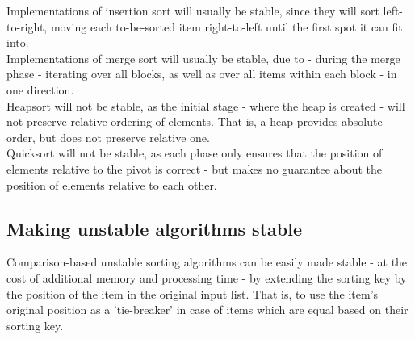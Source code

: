 \documentclass[a4paper]{scrartcl}
\begin{document}
Implementations of insertion sort will usually be stable, since they will sort
left-to-right, moving each to-be-sorted item right-to-left until the first spot
it can fit into.
\\ 
Implementations of merge sort will usually be stable, due to - during the
merge phase - iterating over all blocks, as well as over all items within each
block - in one direction.
\\
Heapsort will not be stable, as the initial stage - where the heap is created -
will not preserve relative ordering of elements. That is, a heap provides
absolute order, but does not preserve relative one.
\\
Quicksort will not be stable, as each phase only ensures that the position of
elements relative to the pivot is correct - but makes no guarantee about the
position of elements relative to each other.

\subsection{Making unstable algorithms stable}

Comparison-based unstable sorting algorithms can be easily made stable - at the
cost of additional memory and processing time - by extending the sorting key by
the position of the item in the original input list. That is, to use the item's
original position as a 'tie-breaker' in case of items which are equal based on
their sorting key.
\end{document}
